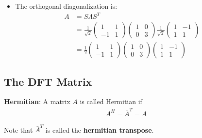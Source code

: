\documentclass[10pt,a4paper]{article}
\begin{document}
\begin{itemize}
    \item The orthogonal diagonalization is:
    \begin{align*}
        A&=S \Lambda S^{T} \\ &=\frac{1}{\sqrt{2}}\left(\begin{array}{cc}
            1 & 1 \\
            -1 & 1
            \end{array}\right)\left(\begin{array}{cc}
            1 & 0 \\
            0 & 3
            \end{array}\right) \frac{1}{\sqrt{2}}\left(\begin{array}{cc}
            1 & -1 \\
            1 & 1
            \end{array}\right)\\ &=\frac{1}{2}\left(\begin{array}{cc}
            1 & 1 \\
            -1 & 1
            \end{array}\right)\left(\begin{array}{cc}
            1 & 0 \\
            0 & 3
            \end{array}\right)\left(\begin{array}{cc}
            1 & -1 \\
            1 & 1
            \end{array}\right)    
    \end{align*}
\end{itemize}

\pagebreak
\subsection{The DFT Matrix}

\begin{tcolorbox}[breakable,colback=white]
\textbf{Hermitian}: A matrix $A$ is called Hermitian if
\begin{align*}
    A^{H}=\bar{A}^{T}=A
\end{align*}
\end{tcolorbox}
Note that $\bar{A}^{T}$ is called the \textbf{hermitian transpose}.
\end{document}

